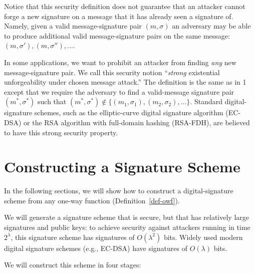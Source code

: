 \documentclass[
  letterpaper,
]{scrbook}
\theoremstyle{definition}
\theoremstyle{plain}
\theoremstyle{plain}
\theoremstyle{remark}
\begin{document}
Notice that this security definition does not guarantee that an attacker
cannot forge a new signature on a message that it has already seen a
signature of. Namely, given a valid message-signature pair
\((m, \sigma)\) an adversary may be able to produce additional valid
message-signature pairs on the same message:
\((m, \sigma'), (m, \sigma''), \dots\).

In some applications, we want to prohibit an attacker from finding
\emph{any} new message-signature pair. We call this security notion
``\emph{strong} existential unforgeability under chosen message
attack.'' The definition is the same as in 1 except that we require the
adversary to find a valid-message signature pair \((m^*, \sigma^*)\)
such that
\((m^*, \sigma^*) \not \in \{ (m_1, \sigma_1), (m_2, \sigma_2), \dots \}\).
Standard digital-signature schemes, such as the elliptic-curve digital
signature algorithm (EC-DSA) or the RSA algorithm with full-domain
hashing (RSA-FDH), are believed to have this strong security property.

\section{Constructing a Signature
Scheme}\label{constructing-a-signature-scheme}

In the following sections, we will show how to construct a
digital-signature scheme from any one-way function
(Definition~\ref{def-owf}).

We will generate a signature scheme that is secure, but that has
relatively large signatures and public keys: to achieve security against
attackers running in time \(2^\lambda\), this signature scheme has
signatures of \(O(\lambda^2)\) bits. Widely used modern digital
signature schemes (e.g., EC-DSA) have signatures of \(O(\lambda)\) bits.


We will construct this scheme in four stages:
\end{document}

